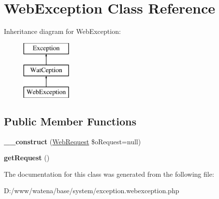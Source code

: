\hypertarget{class_web_exception}{\section{Web\-Exception Class Reference}
\label{class_web_exception}
}
Inheritance diagram for Web\-Exception\-:\begin{figure}[H]
\begin{center}
\leavevmode
\includegraphics[height=3.000000cm]{class_web_exception}
\end{center}
\end{figure}
\subsection*{Public Member Functions}
\begin{DoxyCompactItemize}
\item 
\hypertarget{class_web_exception_a0c25c616e4a23d71828e25fc13da6d6b}{{\bfseries \-\_\-\-\_\-construct} (\hyperlink{class_web_request}{Web\-Request} \$o\-Request=null)}\label{class_web_exception_a0c25c616e4a23d71828e25fc13da6d6b}

\item 
\hypertarget{class_web_exception_ae202e852d6e1c4aa9e31083f78707a4e}{{\bfseries get\-Request} ()}\label{class_web_exception_ae202e852d6e1c4aa9e31083f78707a4e}

\end{DoxyCompactItemize}


The documentation for this class was generated from the following file\-:\begin{DoxyCompactItemize}
\item 
D\-:/www/watena/base/system/exception.\-webexception.\-php\end{DoxyCompactItemize}
